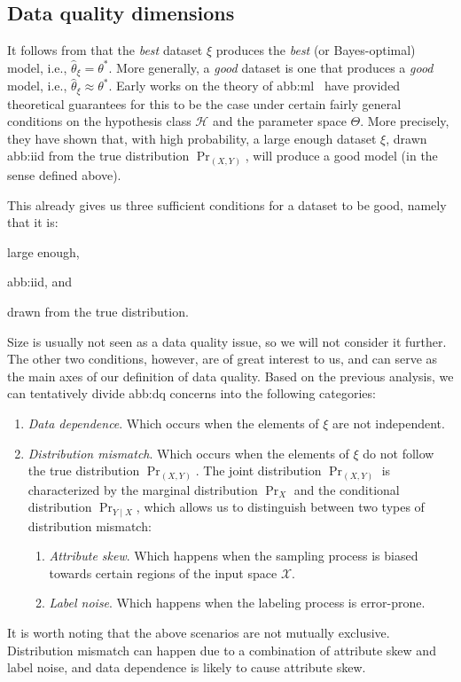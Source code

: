 \subsection{Data quality dimensions}%
\label{sub:data_quality_dimensions}

It follows from  that
the \emph{best} dataset \(\xi\) produces the \emph{best}
(or Bayes-optimal) model, i.e., \(\hat{\theta}_{\xi} = \theta^{\ast}\).
More generally, a \emph{good} dataset is one that produces a \emph{good} model,
i.e., \(\hat{\theta}_{\xi} \approx \theta^{\ast}\).
Early works on the theory of \gls{abb:ml}~\cite{%
	vapnikPrinciplesRiskMinimization1991,%
	neweyChapter36Large1994,%
	vapnikNatureStatisticalLearning2010%
}
have provided theoretical guarantees for this to be the case
under certain fairly general conditions
on the hypothesis class \(\mathcal{H}\) and the parameter space \(\Theta\).
More precisely, they have shown that, with high probability,
a large enough dataset \(\xi\), drawn \gls{abb:iid}
from the true distribution \(\Pr_{(X, Y)}\),
will produce a good model (in the sense defined above).

This already gives us three sufficient conditions for a dataset to be good,
namely that it is:
\begin{enumerate*}[label=(\roman*)]
	\item large enough,
	\item \gls{abb:iid}, and
	\item drawn from the true distribution.
\end{enumerate*}
Size is usually not seen as a data quality issue,
so we will not consider it further.
The other two conditions, however, are of great interest to us,
and can serve as the main axes of our definition of data quality.
Based on the previous analysis,
we can tentatively divide \gls{abb:dq} concerns into the following categories:
\begin{enumerate}
	\item \emph{Data dependence}.
	      Which occurs when the elements of \(\xi\) are not independent.
	\item \emph{Distribution mismatch}.
	      Which occurs when the elements of \(\xi\)
	      do not follow the true distribution \(\Pr_{(X, Y)}\).
	      The joint distribution \(\Pr_{(X, Y)}\)
	      is characterized by the marginal distribution \(\Pr_{X}\)
	      and the conditional distribution \(\Pr_{Y \mid X}\),
	      which allows us to distinguish between two types of distribution mismatch:
	      \begin{enumerate}
		      \item \emph{Attribute skew}.
		            Which happens when the sampling process
		            is biased towards certain regions of the input space \(\mathcal{X}\).
		      \item \emph{Label noise}.
		            Which happens when the labeling process is error-prone.
	      \end{enumerate}
\end{enumerate}
It is worth noting that the above scenarios are not mutually exclusive.
Distribution mismatch can happen due to a combination
of attribute skew and label noise,
and data dependence is likely to cause attribute skew.

